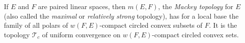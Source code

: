If $E$ and $F$ are paired linear spaces, then $m(E,F)$, the \textit{Mackey topology} for $E$ (also called the \textit{maximal} or \textit{relatively strong} topology), has for a local base the family of all polars of $w(F,E)$-compact circled convex subsets of $F$. It is the topology $\mathcal{T}_c$ of uniform convergence on $w(F,E)$-compact circled convex sets.
